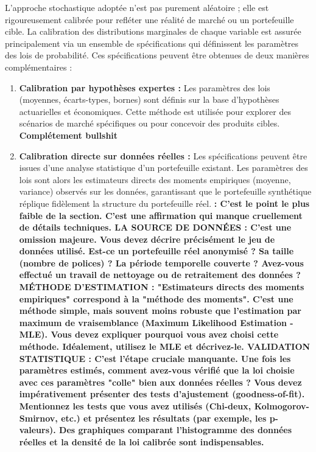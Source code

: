 L'approche stochastique adoptée n'est pas purement aléatoire ; elle est rigoureusement calibrée pour refléter une réalité de marché ou un portefeuille cible. La calibration des distributions marginales de chaque variable est assurée principalement via un ensemble de spécifications qui définissent les paramètres des lois de probabilité. Ces spécifications peuvent être obtenues de deux manières complémentaires :
\begin{enumerate}
    \item \textbf{Calibration par hypothèses expertes :} Les paramètres des lois (moyennes, écarts-types, bornes) sont définis sur la base d'hypothèses actuarielles et économiques. Cette méthode est utilisée pour explorer des scénarios de marché spécifiques ou pour concevoir des produits cibles. \textbf{Complétement bullshit}
    \item \textbf{Calibration directe sur données réelles :} Les spécifications peuvent être issues d'une analyse statistique d'un portefeuille existant. Les paramètres des lois sont alors les estimateurs directs des moments empiriques (moyenne, variance) observés sur les données, garantissant que le portefeuille synthétique réplique fidèlement la structure du portefeuille réel. \textbf{: C'est le point le plus faible de la section. C'est une affirmation qui manque cruellement de détails techniques.
    LA SOURCE DE DONNÉES : C'est une omission majeure. Vous devez décrire précisément le jeu de données utilisé. Est-ce un portefeuille réel anonymisé ? Sa taille (nombre de polices) ? La période temporelle couverte ? Avez-vous effectué un travail de nettoyage ou de retraitement des données ?
    MÉTHODE D'ESTIMATION : "Estimateurs directs des moments empiriques" correspond à la "méthode des moments". C'est une méthode simple, mais souvent moins robuste que l'estimation par maximum de vraisemblance (Maximum Likelihood Estimation - MLE). Vous devez expliquer pourquoi vous avez choisi cette méthode. Idéalement, utilisez le MLE et décrivez-le.
    VALIDATION STATISTIQUE : C'est l'étape cruciale manquante. Une fois les paramètres estimés, comment avez-vous vérifié que la loi choisie avec ces paramètres "colle" bien aux données réelles ? Vous devez impérativement présenter des tests d'ajustement (goodness-of-fit). Mentionnez les tests que vous avez utilisés (Chi-deux, Kolmogorov-Smirnov, etc.) et présentez les résultats (par exemple, les p-valeurs). Des graphiques comparant l'histogramme des données réelles et la densité de la loi calibrée sont indispensables.}
\end{enumerate}

